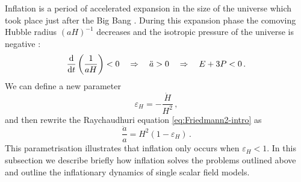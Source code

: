Inflation is a period of accelerated expansion in the size of the universe
which took place just after the Big Bang
\cite{Starobinsky:1980te,Guth:1980zm,Albrecht:1982wi,Linde:1981mu,
Starobinsky:1982ee}. During this
expansion phase  the comoving Hubble radius $(aH)^{-1}$ decreases and the isotropic
pressure of the universe is negative \cite{book:liddle, Baumann2009}:
% 
\begin{equation}
\label{eq:infldefn-intro}
 \frac{\mathrm{d} }{\mathrm{d} t}\left( \frac{1}{aH}\right) <0 
\quad \Rightarrow  \quad
\ddot{a}>0
\quad \Rightarrow \quad
E + 3P < 0 \,.
\end{equation}
% 
We can define a new parameter 
% 
\begin{equation}
\label{eq:epsilonHdefn-intro}
\varepsilon_H = -\frac{\dot{H}}{H^2}\,,
\end{equation}
% 
and then rewrite
the Raychaudhuri equation \eqref{eq:Friedmann2-intro} as
% 
\begin{equation}
 \label{eq:Friedeps-intro}
 \frac{\ddot{a}}{a} = H^2 (1-\varepsilon_H)\,.
\end{equation}
% 
This parametrisation illustrates that inflation only occurs when $\varepsilon_H<1$.
In this subsection we describe briefly how inflation solves the problems
outlined above and outline the inflationary dynamics of single scalar field
models. 

